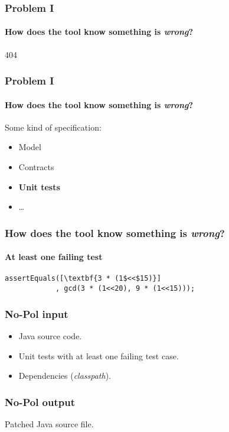 \begin{frame}
\frametitle{Problem I}
\framesubtitle{How does the tool know something is \textit{wrong}?}
\begin{center}
\Huge{404}
\end{center}
\end{frame}

\begin{frame}
\frametitle{Problem I}
\framesubtitle{How does the tool know something is \textit{wrong}?}
Some kind of specification:
\begin{itemize}
 \item Model
 \item Contracts
 \item \textbf{Unit tests}
 \item \dots
\end{itemize}
\end{frame}

\begin{frame}[fragile]
\frametitle{How does the tool know something is \textit{wrong}?}
\framesubtitle{At least one failing test}
      
      \begin{lstlisting}[escapeinside=\[\]]
assertEquals([\textbf{3 * (1$<<$15)}]
            , gcd(3 * (1<<20), 9 * (1<<15)));
	\end{lstlisting}
\end{frame}

\begin{frame}
\frametitle{No-Pol input}
\begin{itemize}
 \item Java source code.
 \item Unit tests with at least one failing test case.
 \item Dependencies (\textit{classpath}).
\end{itemize}
\end{frame}

\begin{frame}
\frametitle{No-Pol output}
Patched Java source file.
\end{frame}
